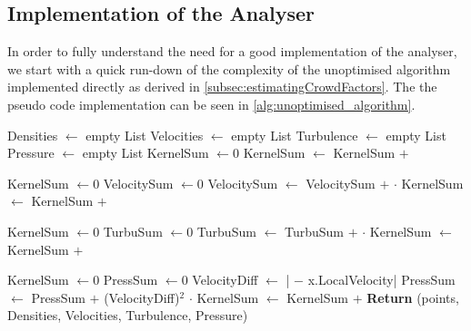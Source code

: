 \subsection{Implementation of the Analyser}\label{s3:analyser_implementation}

In order to fully understand the need for a good implementation of the analyser, we start with a quick run-down of the complexity of the unoptimised algorithm implemented directly as derived in \cref{subsec:estimatingCrowdFactors}. The the pseudo code implementation can be seen in \cref{alg:unoptimised_algorithm}.
\begin{center}
\label{alg:unoptimised_algorithm}
\begin{algorithmic}[1]

\State Densities $\gets$ empty List
\State Velocities $\gets$ empty List
\State Turbulence $\gets$ empty List
\State Pressure $\gets$ empty List
    \State KernelSum $\gets 0$
        \State KernelSum $\gets$ KernelSum $+$ 
    \EndFor
    \State {}
\EndFor

    \State KernelSum $\gets 0$
    \State VelocitySum $\gets 0$
        \State VelocitySum $\gets$ VelocitySum $+$  $\cdot$ 
        \State KernelSum $\gets$ KernelSum $+$ 
    \EndFor
    \State {}
\EndFor

    \State KernelSum $\gets 0$
    \State TurbuSum $\gets 0$
        \State TurbuSum $\gets$ TurbuSum $+$  $\cdot$ 
        \State KernelSum $\gets$ KernelSum $+$ 
    \EndFor
    \State {}
\EndFor

    \State KernelSum $\gets 0$
    \State PressSum $\gets 0$
        \State VelocityDiff $\gets$ | $-$ x.LocalVelocity|
        \State PressSum $\gets$ PressSum $+$ (VelocityDiff)$^2$ $\cdot$ 
        \State KernelSum $\gets$ KernelSum $+$ 
    \EndFor
    \State {}
\EndFor
\State\textbf{Return} (points, Densities, Velocities, Turbulence, Pressure)
\EndFunction
\end{algorithmic}
\end{center}

